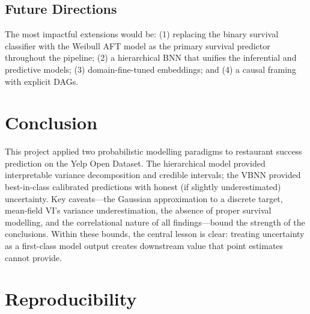 \documentclass[10pt, letterpaper]{article}
\begin{document}
\subsection{Future Directions}

The most impactful extensions would be: (1) replacing the binary survival classifier with the Weibull AFT model as the primary survival predictor throughout the pipeline; (2) a hierarchical BNN that unifies the inferential and predictive models; (3) domain-fine-tuned embeddings; and (4) a causal framing with explicit DAGs.

\section{Conclusion}

This project applied two probabilistic modelling paradigms to restaurant success prediction on the Yelp Open Dataset. The hierarchical model provided interpretable variance decomposition and credible intervals; the VBNN provided best-in-class calibrated predictions with honest (if slightly underestimated) uncertainty. Key caveats---the Gaussian approximation to a discrete target, mean-field VI's variance underestimation, the absence of proper survival modelling, and the correlational nature of all findings---bound the strength of the conclusions. Within these bounds, the central lesson is clear: treating uncertainty as a first-class model output creates downstream value that point estimates cannot provide.

\section{Reproducibility}
\end{document}
